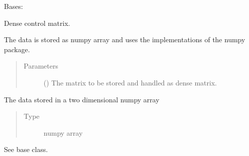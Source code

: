 \documentclass[letterpaper,10pt,english]{sphinxmanual}
\begin{document}
\begin{fulllineitems}
\label{\detokenize{qsim:qsim.matrix.DenseOperator}}
Bases: {\hyperref[\detokenize{qsim:qsim.matrix.OperatorMatrix}]{}}

Dense control matrix.

The data is stored as numpy array and uses the implementations of the
numpy package.
\begin{quote}\begin{description}
\item[{Parameters}] \leavevmode
{} () \textendash{} The matrix to be stored and handled as dense matrix.

\end{description}\end{quote}

\begin{fulllineitems}
\label{\detokenize{qsim:qsim.matrix.DenseOperator.data}}
The data stored in a two dimensional numpy array
\begin{quote}\begin{description}
\item[{Type}] \leavevmode
numpy array

\end{description}\end{quote}

\end{fulllineitems}


\begin{fulllineitems}
\label{\detokenize{qsim:qsim.matrix.DenseOperator.conj}}
See base class.


\end{fulllineitems}
\end{fulllineitems}
\end{document}
